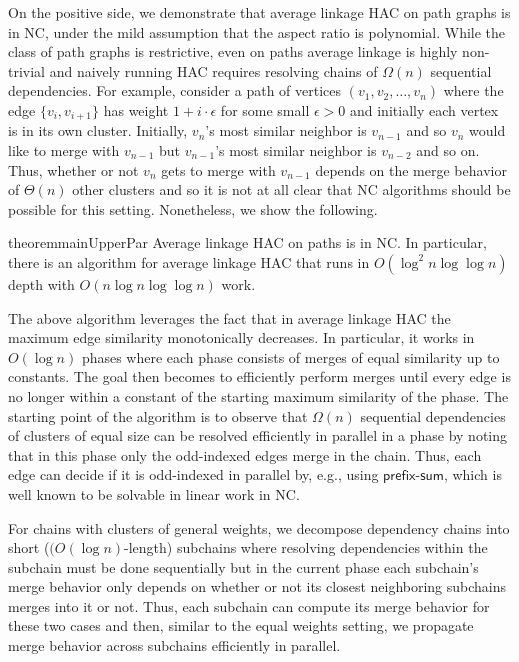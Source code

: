 \documentclass[11pt]{article}
\newcommand{\NC}{\textsc{NC}\xspace}
\begin{document}
On the positive side, we demonstrate that average linkage HAC on path graphs is in \NC, under the mild assumption that the aspect ratio is polynomial.
While the class of path graphs is restrictive, even on paths average linkage is highly non-trivial and naively running HAC requires resolving chains of $\Omega(n)$ sequential dependencies. For example, consider a path of vertices $(v_1, v_2, \ldots, v_n)$ where the edge $\{v_{i}, v_{i+1}\}$ has weight $1+i \cdot \epsilon$ for some small $\epsilon > 0$ and initially each vertex is in its own cluster. Initially, $v_n$'s most similar neighbor is $v_{n-1}$ and so $v_n$ would like to merge with $v_{n-1}$ but $v_{n-1}$'s most similar neighbor is $v_{n-2}$ and so on. Thus, whether or not $v_n$ gets to merge with $v_{n-1}$ depends on the merge behavior of $\Theta(n)$ other clusters and so it is not at all clear that \NC algorithms should be possible for this setting. Nonetheless, we show the following.
\begin{restatable}{theorem}{mainUpperPar}\label{thm:mainUpperPar}
    Average linkage HAC on paths is in \NC. In particular, there is an algorithm for average linkage HAC that runs in $O(\log^2 n \log\log n)$ depth with $O(n\log n\log\log n)$ work.
\end{restatable}
\noindent  The above algorithm leverages the fact that in average linkage HAC the maximum edge similarity monotonically decreases. In particular, it works in $O(\log n)$ phases where each phase consists of merges of equal similarity up to constants. The goal then becomes to efficiently perform merges until every edge is no longer within a constant of the starting maximum similarity of the phase. The starting point of the algorithm is to observe that $\Omega(n)$ sequential dependencies of clusters of equal size can be resolved efficiently in parallel in a phase by noting that in this phase only the odd-indexed edges merge in the chain. Thus, each edge can decide if it is odd-indexed in parallel by, e.g., using $\mathsf{prefix\text{-}sum}$, which is well known to be solvable in linear work in \NC.

For chains with clusters of general weights, we decompose dependency chains into short ($(O(\log n)$-length) subchains where resolving dependencies within the subchain must be done sequentially but in the current phase each subchain's merge behavior only depends on whether or not its closest neighboring subchains merges into it or not. Thus, each subchain can compute its merge behavior for these two cases and then, similar to the equal weights setting, we propagate merge behavior across subchains efficiently in parallel.
\end{document}
